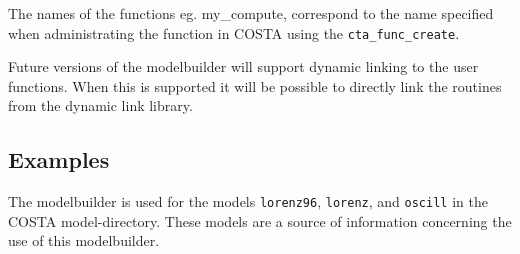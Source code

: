 The names of the functions eg. my\_compute, correspond to the name specified when administrating the function in
COSTA using the {\tt cta\_func\_create}. 

Future versions of the modelbuilder will support dynamic linking to the user functions. When this is supported it
will be possible to directly link the routines from the dynamic link library. 

\subsection{Examples}
The modelbuilder is used for the models \verb|lorenz96|, \verb|lorenz|, and \verb|oscill| in the COSTA model-directory. These models are
a source of information concerning the use of this modelbuilder.


